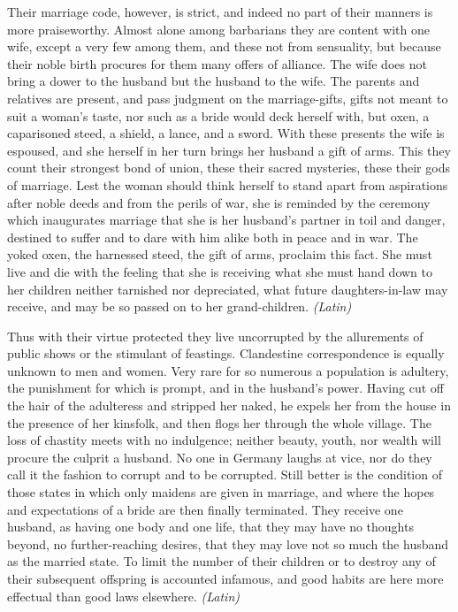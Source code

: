 Their marriage code, however, is strict, and indeed no part of their manners is more praiseworthy. Almost alone among barbarians they are content with one wife, except a very few among them, and these not from sensuality, but because their noble birth procures for them many offers of alliance. The wife does not bring a dower to the husband but the husband to the wife. The parents and relatives are present, and pass judgment on the marriage-gifts, gifts not meant to suit a woman's taste, nor such as a bride would deck herself with, but oxen, a caparisoned steed, a shield, a lance, and a sword. With these presents the wife is espoused, and she herself in her turn brings her husband a gift of arms. This they count their strongest bond of union, these their sacred mysteries, these their gods of marriage. Lest the woman should think herself to stand apart from aspirations after noble deeds and from the perils of war, she is reminded by the ceremony which inaugurates marriage that she is her husband's partner in toil and danger, destined to suffer and to dare with him alike both in peace and in war. The yoked oxen, the harnessed steed, the gift of arms, proclaim this fact. She must live and die with the feeling that she is receiving what she must hand down to her children neither tarnished nor depreciated, what future daughters-in-law may receive, and may be so passed on to her grand-children. \emph{(Latin)}


Thus with their virtue protected they live uncorrupted by the allurements of public shows or the stimulant of feastings. Clandestine correspondence is equally unknown to men and women. Very rare for so numerous a population is adultery, the punishment for which is prompt, and in the husband's power. Having cut off the hair of the adulteress and stripped her naked, he expels her from the house in the presence of her kinsfolk, and then flogs her through the whole village. The loss of chastity meets with no indulgence; neither beauty, youth, nor wealth will procure the culprit a husband. No one in Germany laughs at vice, nor do they call it the fashion to corrupt and to be corrupted. Still better is the condition of those states in which only maidens are given in marriage, and where the hopes and expectations of a bride are then finally terminated. They receive one husband, as having one body and one life, that they may have no thoughts beyond, no further-reaching desires, that they may love not so much the husband as the married state. To limit the number of their children or to destroy any of their subsequent offspring is accounted infamous, and good habits are here more effectual than good laws elsewhere. \emph{(Latin)}

